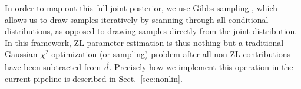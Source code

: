 \documentclass[twocolumn]{aa}
\newcommand{\dv}[0]{\vec{d}}
\newcommand{\n}[0]{\vec{n}}
\newcommand{\s}[0]{\vec{s}}
\newcommand{\N}[0]{\tens{N}}
\begin{document}


In order to map out this full joint posterior, we use Gibbs 
sampling \citep[e.g.,][]{geman:1984}, which allows
us to draw samples iteratively by scanning through all conditional
distributions, as opposed to drawing samples directly from the joint
distribution. In this framework, ZL parameter estimation is
thus nothing but a traditional Gaussian $\chi^2$ optimization (or
sampling) problem after all non-ZL contributions have been subtracted
from $\dv$. Precisely how we implement this operation in the
current pipeline is described in Sect.~\ref{sec:nonlin}.
\end{document}
